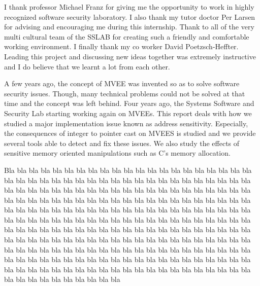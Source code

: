 \documentclass[english]{enstaPRE}
\begin{document}
\couverture






I thank professor Michael Franz for giving me the opportunity to work in highly recognized software security laboratory.
I also thank my tutor doctor Per Larsen for advising and encouraging me during this internship.
Thank to all of the very multi cultural team of the SSLAB for creating such a friendly and comfortable working environment.
I finally thank my co worker David Poetzsch-Heffter. Leading this project and discussing new ideas together was extremely 
instructive and I do believe that we learnt a lot from each other.


A few years ago, the concept of MVEE was invented so as to solve software security issues. 
Though, many technical problems could not be solved at that time and the concept was left behind.
Four years ago, the Systems Software and Security Lab starting working again on MVEEs.
This report deals with how we studied a major implementation issue known as address sensitivity.
Especially, the consequences of integer to pointer cast on MVEES is studied and we provide several tools able to detect and fix 
these issues. We also study the effects of sensitive memory oriented manipulations such as C's memory allocation.
\tableofcontents

Bla bla bla bla bla bla bla bla bla bla bla bla bla bla bla bla bla bla bla bla bla bla bla bla bla bla bla bla bla bla bla bla bla bla bla bla bla bla bla bla bla bla bla bla bla bla bla bla bla bla bla bla bla bla bla bla bla bla bla bla bla bla bla bla bla bla bla bla bla bla bla bla bla bla bla bla bla bla bla bla bla bla bla bla bla bla bla bla bla bla bla bla bla bla bla bla bla bla bla bla bla bla bla bla bla bla bla bla bla bla bla bla bla bla bla bla bla bla bla bla bla bla bla bla bla bla bla bla bla bla bla bla bla bla bla bla bla bla bla bla bla bla bla bla bla bla bla bla bla bla bla bla bla bla bla bla bla bla bla bla bla bla bla bla bla bla bla bla bla bla bla bla bla bla bla bla bla bla bla bla bla bla bla bla bla bla bla bla bla bla bla bla bla bla bla bla bla bla bla bla bla bla bla bla bla bla bla bla bla bla bla bla bla bla bla bla bla bla bla bla bla bla bla bla bla bla bla bla bla bla bla bla bla bla bla bla bla bla bla bla bla
\end{document}
